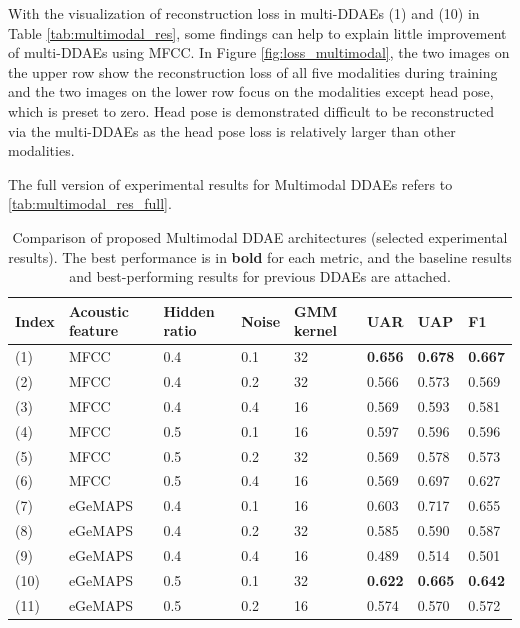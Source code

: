 With the visualization of reconstruction loss in multi-DDAEs (1) and (10) in Table \ref{tab:multimodal_res}, some findings can help to explain little improvement of multi-DDAEs using MFCC. In Figure \ref{fig:loss_multimodal}, the two images on the upper row show the reconstruction loss of all five modalities during training and the two images on the lower row focus on the modalities except head pose, which is preset to zero. Head pose is demonstrated difficult to be reconstructed via the multi-DDAEs as the head pose loss is relatively larger than other modalities. 

The full version of experimental results for Multimodal DDAEs refers to \ref{tab:multimodal_res_full}.



\begin{table}[htb]
    \small
    \centering
    \caption{Comparison of proposed Multimodal DDAE architectures (selected experimental results). The best performance is in \textbf{bold} for each metric, and the baseline results and best-performing results for previous DDAEs are attached.}
    \begin{tabular}{l|p{1.8cm}|p{1.25cm}|l|p{1.2cm}|l|l|l}
    \Xhline{2\arrayrulewidth}
        Index & Acoustic feature & Hidden ratio & Noise & GMM kernel & UAR & UAP & F1 \\
        \hline
        (1)  & MFCC  & 0.4 & 0.1 & 32 & \textbf{0.656} & \textbf{0.678} & \textbf{0.667} \\
        (2)  & MFCC  & 0.4 & 0.2 & 32 & 0.566 & 0.573 & 0.569 \\
        (3)  & MFCC  & 0.4 & 0.4 & 16 & 0.569 & 0.593 & 0.581 \\
        (4)  & MFCC  & 0.5 & 0.1 & 16 & 0.597 & 0.596 & 0.596 \\
        (5)  & MFCC  & 0.5 & 0.2 & 32 & 0.569 & 0.578 & 0.573 \\
        (6)  & MFCC  & 0.5 & 0.4 & 16 & 0.569 & 0.697 & 0.627 \\
        \hline
        (7)  & eGeMAPS & 0.4 & 0.1 & 16 & 0.603 & 0.717 & 0.655 \\
        (8)  & eGeMAPS & 0.4 & 0.2 & 32 & 0.585 & 0.590 & 0.587 \\
        (9)  & eGeMAPS & 0.4 & 0.4 & 16 & 0.489 & 0.514 & 0.501 \\
        (10) & eGeMAPS & 0.5 & 0.1 & 32 & \textbf{0.622} & \textbf{0.665} & \textbf{0.642} \\
        (11) & eGeMAPS & 0.5 & 0.2 & 16 & 0.574 & 0.570 & 0.572 \\

\end{tabular}
\end{table}
